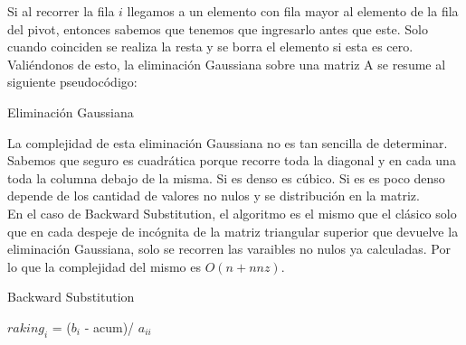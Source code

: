 Si al recorrer la fila $i$ llegamos a un elemento con fila mayor al elemento de la fila del pivot, entonces sabemos que tenemos que ingresarlo antes que este. Solo cuando coinciden se realiza la resta y se borra el elemento si esta es cero. \\

Valiéndonos de esto, la eliminación Gaussiana sobre una matriz A se resume al siguiente pseudocódigo: \\

\begin{algorithm}[H]
\caption{Eliminación Gaussiana}
\begin{algorithmic}[4]
					\EndIf
				\EndWhile
			\EndIf
		\EndFor
	\EndFor						
\EndProcedure 

\end{algorithmic}
\end{algorithm} 

La complejidad de esta eliminación Gaussiana no es tan sencilla de determinar. Sabemos que seguro es cuadrática porque recorre toda la diagonal y en cada una toda la columna debajo de la misma. Si es denso es cúbico. Si es es poco denso depende de los cantidad de valores no nulos y se distribución en la matriz. \\

En el caso de Backward Substitution, el algoritmo es el mismo que el clásico solo que en cada despeje de incógnita de la matriz triangular superior que devuelve la eliminación Gaussiana, solo se recorren las varaibles no nulos ya calculadas. Por lo que la complejidad del mismo es $O(n+nnz)$. 

\begin{algorithm}[H]
\caption{Backward Substitution}
\begin{algorithmic}[5]
    	 
		\EndWhile
		$raking_{i}$ = ($b_{i}$ - acum)/ $a_{ii}$
	\EndFor						
\EndProcedure 


\end{algorithmic}
\end{algorithm}